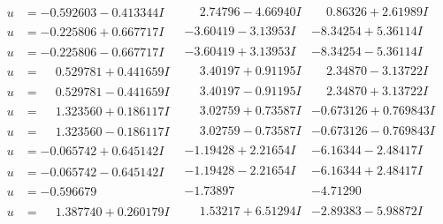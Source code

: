 \documentclass[1p]{elsarticle_modified}
\theoremstyle{definition}
\begin{document}
$$\begin{array}{c|c|c}
\begin{aligned}
u &= -0.592603 - 0.413344 I\end{aligned}
 & \phantom{-}2.74796 - 4.66940 I & \phantom{-}0.86326 + 2.61989 I \\ \hline\begin{aligned}
u &= -0.225806 + 0.667717 I\end{aligned}
 & -3.60419 - 3.13953 I & -8.34254 + 5.36114 I \\ \hline\begin{aligned}
u &= -0.225806 - 0.667717 I\end{aligned}
 & -3.60419 + 3.13953 I & -8.34254 - 5.36114 I \\ \hline\begin{aligned}
u &= \phantom{-}0.529781 + 0.441659 I\end{aligned}
 & \phantom{-}3.40197 + 0.91195 I & \phantom{-}2.34870 - 3.13722 I \\ \hline\begin{aligned}
u &= \phantom{-}0.529781 - 0.441659 I\end{aligned}
 & \phantom{-}3.40197 - 0.91195 I & \phantom{-}2.34870 + 3.13722 I \\ \hline\begin{aligned}
u &= \phantom{-}1.323560 + 0.186117 I\end{aligned}
 & \phantom{-}3.02759 + 0.73587 I & -0.673126 + 0.769843 I \\ \hline\begin{aligned}
u &= \phantom{-}1.323560 - 0.186117 I\end{aligned}
 & \phantom{-}3.02759 - 0.73587 I & -0.673126 - 0.769843 I \\ \hline\begin{aligned}
u &= -0.065742 + 0.645142 I\end{aligned}
 & -1.19428 + 2.21654 I & -6.16344 - 2.48417 I \\ \hline\begin{aligned}
u &= -0.065742 - 0.645142 I\end{aligned}
 & -1.19428 - 2.21654 I & -6.16344 + 2.48417 I \\ \hline\begin{aligned}
u &= -0.596679\phantom{ +0.000000I}\end{aligned}
 & -1.73897\phantom{ +0.000000I} & -4.71290\phantom{ +0.000000I} \\ \hline\begin{aligned}
u &= \phantom{-}1.387740 + 0.260179 I\end{aligned}
 & \phantom{-}1.53217 + 6.51294 I & -2.89383 - 5.98872 I \\ \hline\begin{aligned}

\end{aligned}
\end{array}$$
\end{document}
